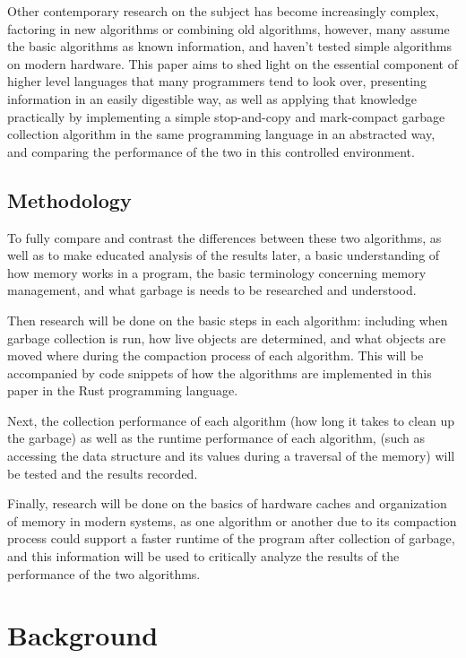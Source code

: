 \documentclass[index]{subfiles}
\begin{document}
Other contemporary research on the subject has become increasingly complex, factoring in new algorithms or combining old algorithms, however, many assume the basic algorithms as known information, and haven't tested simple algorithms on modern hardware. This paper aims to shed light on the essential component of higher level languages that many programmers tend to look over, presenting information in an easily digestible way, as well as applying that knowledge practically by implementing a simple stop-and-copy and mark-compact garbage collection algorithm in the same programming language in an abstracted way, and comparing the performance of the two in this controlled environment.

\subsection{Methodology}

To fully compare and contrast the differences between these two algorithms, as well as to make educated analysis of the results later, a basic understanding of how memory works in a program, the basic terminology concerning memory management, and what garbage is needs to be researched and understood.

Then research will be done on the basic steps in each algorithm: including when garbage collection is run, how live objects are determined, and what objects are moved where during the compaction process of each algorithm. This will be accompanied by code snippets of how the algorithms are implemented in this paper in the Rust programming language.

Next, the collection performance of each algorithm (how long it takes to clean up the garbage) as well as the runtime performance of each algorithm, (such as accessing the data structure and its values during a traversal of the memory) will be tested and the results recorded.

Finally, research will be done on the basics of hardware caches and organization of memory in modern systems, as one algorithm or another due to its compaction process could support a faster runtime of the program after collection of garbage, and this information will be used to critically analyze the results of the performance of the two algorithms.

\section{Background}
\end{document}
